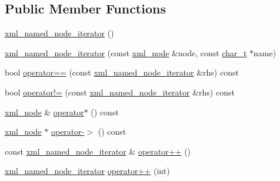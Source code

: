 \subsection*{Public Member Functions}
\begin{DoxyCompactItemize}
\item 
\hyperlink{classpugi_1_1xml__named__node__iterator_a0cf8880a79c3723159d91ef025961bea}{xml\-\_\-named\-\_\-node\-\_\-iterator} ()
\item 
\hyperlink{classpugi_1_1xml__named__node__iterator_a900cdc6c175bcb56b1c66c7c05d2202f}{xml\-\_\-named\-\_\-node\-\_\-iterator} (const \hyperlink{classpugi_1_1xml__node}{xml\-\_\-node} \&node, const \hyperlink{namespacepugi_aef5a7a62cba0507542220ea15afe39df}{char\-\_\-t} $\ast$name)
\item 
bool \hyperlink{classpugi_1_1xml__named__node__iterator_a49533305b71d21a160dda111a2ed9956}{operator==} (const \hyperlink{classpugi_1_1xml__named__node__iterator}{xml\-\_\-named\-\_\-node\-\_\-iterator} \&rhs) const 
\item 
bool \hyperlink{classpugi_1_1xml__named__node__iterator_a3f625995e15f1b5debecdb9fb618c9d9}{operator!=} (const \hyperlink{classpugi_1_1xml__named__node__iterator}{xml\-\_\-named\-\_\-node\-\_\-iterator} \&rhs) const 
\item 
\hyperlink{classpugi_1_1xml__node}{xml\-\_\-node} \& \hyperlink{classpugi_1_1xml__named__node__iterator_a382a1fe2474c25b47d96dd901e3add8a}{operator$\ast$} () const 
\item 
\hyperlink{classpugi_1_1xml__node}{xml\-\_\-node} $\ast$ \hyperlink{classpugi_1_1xml__named__node__iterator_a9fa4ca35803bfd50c61d369241a3da4a}{operator-\/$>$} () const 
\item 
const \hyperlink{classpugi_1_1xml__named__node__iterator}{xml\-\_\-named\-\_\-node\-\_\-iterator} \& \hyperlink{classpugi_1_1xml__named__node__iterator_ae076ec9c8414c5444ce6e4db5052ccef}{operator++} ()
\item 
\hyperlink{classpugi_1_1xml__named__node__iterator}{xml\-\_\-named\-\_\-node\-\_\-iterator} \hyperlink{classpugi_1_1xml__named__node__iterator_a41e2afe0ee62a2d06d0694052277e1f9}{operator++} (int)
\end{DoxyCompactItemize}


